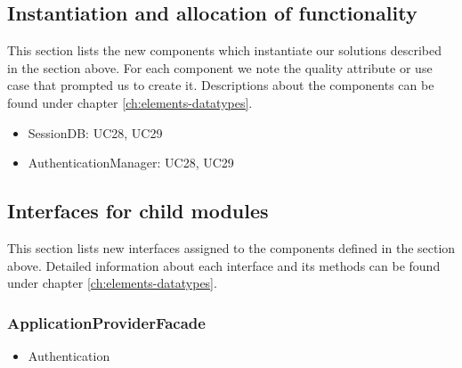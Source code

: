 

\subsection*{Instantiation and allocation of functionality}
    This section lists the new components which instantiate our solutions
    described in the section above. For each component we note the quality
    attribute or use case that prompted us to create it. Descriptions about
    the components can be found under chapter \ref{ch:elements-datatypes}. \\

    \begin{itemize}
        \item SessionDB: UC28, UC29
        \item AuthenticationManager: UC28, UC29
    \end{itemize}


\subsection*{Interfaces for child modules}
    This section lists new interfaces assigned to the components defined
    in the section above. Detailed information about each interface and
    its methods can be found under chapter \ref{ch:elements-datatypes}.

    \subsubsection{ApplicationProviderFacade}
        \begin{itemize}
            \item Authentication
        \end{itemize}

